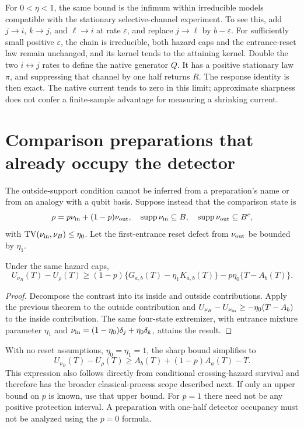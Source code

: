 For $0<\eta<1$, the same bound is the infimum within irreducible models
compatible with the stationary selective-channel experiment. To see this,
add $j\to i$, $k\to j$, and $\ell\to i$ at rate $\varepsilon$, and replace
$j\to\ell$ by $b-\varepsilon$. For sufficiently small positive $\varepsilon$,
the chain is irreducible, both hazard caps and the entrance-reset law remain
unchanged, and its kernel tends to the attaining kernel. Double the two
$i\leftrightarrow j$ rates to define the native generator $Q$. It has a positive
stationary law $\pi$, and suppressing that channel by one half returns $R$.
The response identity is then exact. The native current tends to zero in this
limit; approximate sharpness does not confer a finite-sample advantage for
measuring a shrinking current.

\section{Comparison preparations that already occupy the detector}

The outside-support condition cannot be inferred from a preparation's name or
from an analogy with a qubit basis. Suppose instead that the comparison state is
\[
 \rho=p\nu_{\rm in}+(1-p)\nu_{\rm out},\quad
 \operatorname{supp}\nu_{\rm in}\subseteq B,\quad
 \operatorname{supp}\nu_{\rm out}\subseteq B^c,
\]
with $\operatorname{TV}(\nu_{\rm in},\nu_B)\leq\eta_0$. Let the first-entrance
reset defect from $\nu_{\rm out}$ be bounded by $\eta_1$.
\begin{proposition}
Under the same hazard caps,
\[
 U_{\nu_B}(T)-U_\rho(T)\geq
 (1-p)\{G_{a,b}(T)-\eta_1 K_{a,b}(T)\}
 -p\eta_0\{T-A_b(T)\}.
\]
\end{proposition}
\begin{proof}
Decompose the contrast into its inside and outside contributions. Apply the
previous theorem to the outside contribution and
$U_{\nu_B}-U_{\nu_{\rm in}}\geq-\eta_0(T-A_b)$ to the inside contribution.
The same four-state extremizer, with entrance mixture parameter $\eta_1$ and
$\nu_{\rm in}=(1-\eta_0)\delta_j+\eta_0\delta_k$, attains the result.
\end{proof}
With no reset assumptions, $\eta_0=\eta_1=1$, the sharp bound simplifies to
\[
 U_{\nu_B}(T)-U_\rho(T)\geq A_b(T)+(1-p)A_a(T)-T.
\]
This expression also follows directly from conditional crossing-hazard survival
and therefore has the broader classical-process scope described next. If only
an upper bound on $p$ is known, use that upper bound. For $p=1$ there need not be
any positive protection interval. A preparation with one-half detector
occupancy must not be analyzed using the $p=0$ formula.

